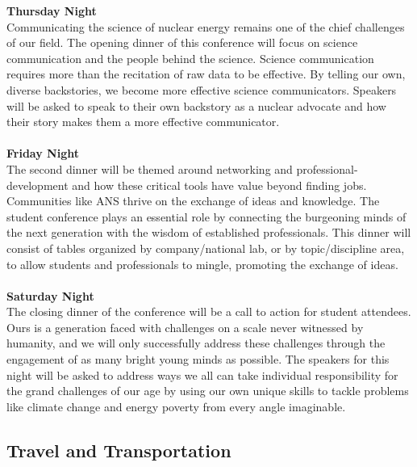 \textbf{Thursday Night}\\
Communicating the science of nuclear energy remains one of the chief challenges of our field. The opening dinner of this conference will focus on science communication and the people behind the science. Science communication requires more than the recitation of raw data to be effective. By telling our own, diverse backstories, we become more effective science communicators. Speakers will be asked to speak to their own backstory as a nuclear advocate and how their story makes them a more effective communicator.\\\\
\indent\textbf{Friday Night}\\
The second dinner will be themed around networking and professional-development and how these critical tools have value beyond finding jobs. Communities like ANS thrive on the exchange of ideas and knowledge. The student conference plays an essential role by connecting the burgeoning minds of the next generation with the wisdom of established professionals. This dinner will consist of tables organized by company/national lab, or by topic/discipline area, to allow students and professionals to mingle, promoting the exchange of ideas.\\\\ 
\indent\textbf{Saturday Night}\\
The closing dinner of the conference will be a call to action for student attendees. Ours is a generation faced with challenges on a scale never witnessed by humanity, and we will only successfully address these challenges through the engagement of as many bright young minds as possible. The speakers for this night will be asked to address ways we all can take individual responsibility for the grand challenges of our age by using our own unique skills to tackle problems like climate change and energy poverty from every angle imaginable.\\ 
\subsection{Travel and Transportation}

